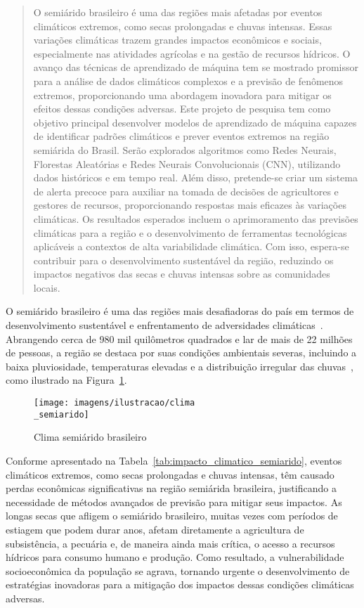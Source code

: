 \documentclass{projetodepesquisa} %
\begin{document}
	\begin{abstract}
		O semiárido brasileiro é uma das regiões mais afetadas por eventos climáticos extremos, como secas prolongadas e chuvas intensas. Essas variações climáticas trazem grandes impactos econômicos e sociais, especialmente nas atividades agrícolas e na gestão de recursos hídricos. O avanço das técnicas de aprendizado de máquina tem se mostrado promissor para a análise de dados climáticos complexos e a previsão de fenômenos extremos, proporcionando uma abordagem inovadora para mitigar os efeitos dessas condições adversas. Este projeto de pesquisa tem como objetivo principal desenvolver modelos de aprendizado de máquina capazes de identificar padrões climáticos e prever eventos extremos na região semiárida do Brasil. Serão explorados algoritmos como Redes Neurais, Florestas Aleatórias e Redes Neurais Convolucionais (CNN), utilizando dados históricos e em tempo real. Além disso, pretende-se criar um sistema de alerta precoce para auxiliar na tomada de decisões de agricultores e gestores de recursos, proporcionando respostas mais eficazes às variações climáticas. Os resultados esperados incluem o aprimoramento das previsões climáticas para a região e o desenvolvimento de ferramentas tecnológicas aplicáveis a contextos de alta variabilidade climática. Com isso, espera-se contribuir para o desenvolvimento sustentável da região, reduzindo os impactos negativos das secas e chuvas intensas sobre as comunidades locais.
	\end{abstract}

	\label{sec:introducao}
	O semiárido brasileiro é uma das regiões mais desafiadoras do país em termos de desenvolvimento sustentável e enfrentamento de adversidades climáticas~\cite{andrade2020}. 
	Abrangendo cerca de 980 mil quilômetros quadrados e lar de mais de 22 milhões de pessoas, a região se destaca por suas condições ambientais severas, incluindo a baixa pluviosidade, temperaturas elevadas e a distribuição irregular das chuvas~\cite{pereira2019}, como ilustrado na Figura~\ref{fig:semiarido}.
	
	\begin{figure}[h]
		\centering
		\texttt{[image: imagens/ilustracao/clima\\\_semiarido]}
		\caption{Clima semiárido brasileiro}
		\label{fig:semiarido}
	\end{figure}
	
	
	Conforme apresentado na Tabela~\ref{tab:impacto_climatico_semiarido}, eventos climáticos extremos, como secas prolongadas e chuvas intensas, têm causado perdas econômicas significativas na região semiárida brasileira, justificando a necessidade de métodos avançados de previsão para mitigar seus impactos. As longas secas que afligem o semiárido brasileiro, muitas vezes com períodos de estiagem que podem durar anos, afetam diretamente a agricultura de subsistência, a pecuária e, de maneira ainda mais crítica, o acesso a recursos hídricos para consumo humano e produção. Como resultado, a vulnerabilidade socioeconômica da população se agrava, tornando urgente o desenvolvimento de estratégias inovadoras para a mitigação dos impactos dessas condições climáticas adversas.
	
\end{document}
